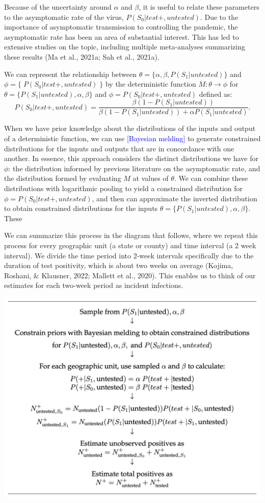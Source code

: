 \documentclass[12pt,twoside]{smiththesis}
\begin{document}
Because of the uncertainty around \(\alpha\) and \(\beta\), it is useful to relate these parameters to the asymptomatic rate of the virus, \(P(S_0|test +, untested)\). Due to the importance of asymptomatic transmission to controlling the pandemic, the asymptomatic rate has been an area of substantial interest. This has led to extensive studies on the topic, including multiple meta-analyses summarizing these results (Ma et al., 2021a; Sah et al., 2021a).

We can represent the relationship between \(\theta = \{ \alpha, \beta, P(S_1|untested)\}\) and \(\phi = \{\; P(S_0|test+, untested)\;\}\) by the deterministic function
\(M: \theta \to \phi\) for \(\theta = \{P(S_1|untested), \alpha, \beta \}\) and \(\phi = P(S_0|test +,untested)\) defined as:
\[P(S_0|test+, untested) = \dfrac{\beta(1 - P(S_1|untested))}{\beta(1-P(S_1|untested)) + \alpha P(S_1|untested)}.\]

When we have prior knowledge about the distributions of the inputs and output of a deterministic function, we can use \textcolor{blue}{[Bayesian melding]} to generate constrained distributions for the inputs and outputs that are in concordance with one another. In essence, this approach considers the distinct distributions we have for \(\phi\): the distribution informed by previous literature on the asymptomatic rate, and the distribution formed by evaluating \(M\) at values of \(\theta\). We can combine these distributions with logarithmic pooling to yield a constrained distribution for \(\phi=P(S_0|test +, untested)\), and then can approximate the inverted distribution to obtain constrained distributions for the inputs \(\theta = \{P(S_1|untested), \alpha, \beta \}\). These

We can summarize this process in the diagram that follows, where we repeat this process for every geographic unit (a state or county) and time interval (a 2 week interval). We divide the time period into 2-week intervals specifically due to the duration of test positivity, which is about two weeks on average (Kojima, Roshani, \& Klausner, 2022; Mallett et al., 2020). This enables us to think of our estimates for each two-week period as incident infections.
\begin{center}\includegraphics[width=0.8\linewidth]{./figure/analysis_diagram} \end{center}
\end{document}
